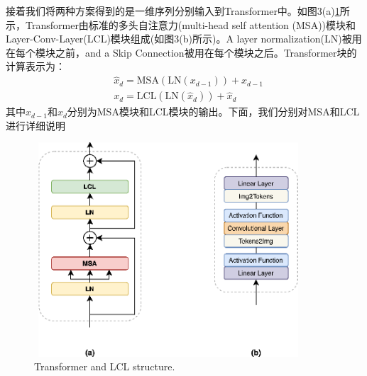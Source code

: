接着我们将两种方案得到的是一维序列分别输入到Transformer中。如图3(a)\ref{fig3}所示，Transformer由标准的多头自注意力(multi-head self attention (MSA))模块和Layer-Conv-Layer(LCL)模块组成(如图3(b)所示)。A layer
normalization(LN)\cite{ba2016layer}被用在每个模块之前，and a Skip Connection被用在每个模块之后。Transformer块的计算表示为：
\begin{equation}
\begin{aligned}
&\hat{x}_{d} = \mathrm{MSA}(\mathrm{LN}(x_{d-1}))+x_{d-1}   \\
&x_d= \mathrm{LCL}(\mathrm{LN}(\hat{x}_{d}))+\hat{x}_{d}\end{aligned}\end{equation}
其中$\hat{x}_{d-1} $和$x_d$分别为MSA模块和LCL模块的输出。下面，我们分别对MSA和LCL进行详细说明\par
\begin{figure}
	\centering
	\includegraphics[height=8cm,width=10cm]{2v2.eps}
	\caption{Transformer and LCL structure.}
	\label{fig3}
\end{figure}

